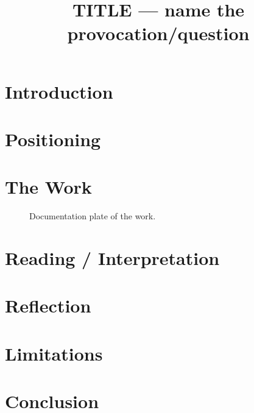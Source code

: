 \documentclass[sigconf,review,anonymous]{acmart}
\begin{document}
\title{TITLE — name the provocation/question}
\begin{abstract}\end{abstract}
\maketitle
\section{Introduction}        %
\section{Positioning}         %
\section{The Work}
\begin{figure}[t]\centering\caption{Documentation plate of the work.}\end{figure}
\section{Reading / Interpretation}
\section{Reflection}          %
\section{Limitations}
\section{Conclusion}

\end{document}
